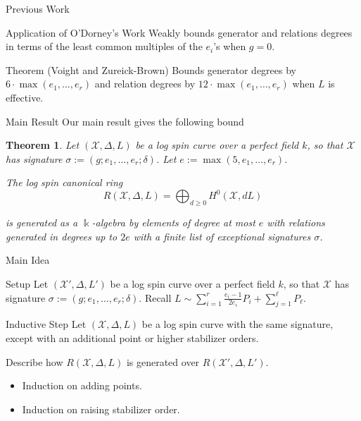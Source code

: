 \documentclass{beamer}
\newtheorem{thm}{Theorem}
\theoremstyle{remark}
\newcommand \sx{{\mathscr X}}
\newcommand{\halfcan}{L}
\newcommand\Bk{{\Bbbk}}
\begin{document}

\begin{frame}{Previous Work}
\begin{block}{Application of O'Dorney's Work}
Weakly bounds generator and relations degrees in terms of
the least common multiples of the $e_i$'s when $g = 0$.
\end{block}

\begin{block}{Theorem (Voight and Zureick-Brown)}
Bounds generator degrees by $6
\cdot \max(e_1, \ldots, e_r)$ and relation degrees by $12 \cdot \max
(e_1, \ldots, e_ r)$ when $\halfcan$ is effective.
\end{block}

\end{frame}


\begin{frame}{Main Result}
Our main result gives the following bound

\begin{thm}
\label{thm:main}
Let $(\sx, \Delta, \halfcan)$ be a log spin curve over a perfect
field $k$, so that $\sx$ has signature $\sigma := (g; e_1, \ldots,
e_r; \delta)$. Let $e := \max(5, e_1, \ldots, e_r)$.

The log spin canonical ring 
\[
	R(\sx, \Delta, \halfcan) = \bigoplus_{d \geq 0} H^0(\sx, d \halfcan)
\]

\noindent
is generated as a $\Bk$-algebra by elements of degree at most $e$ with
relations generated in degrees up to $2e$ with a finite list of exceptional
signatures $\sigma$.
\end{thm}
\end{frame}


\begin{frame}{Main Idea}
\begin{block}{Setup}
Let $(\sx', \Delta, \halfcan')$ be a log spin curve over a perfect
field $k$, so that $\sx$ has signature $\sigma := (g; e_1, \ldots,
e_r; \delta)$. Recall $\halfcan \sim \sum_{i = 1}^{r} \frac{e_i - 1}{2e_i} P_i
+ \sum_{j = 1}^{\ell} P_\ell$.
\end{block}

\begin{block}{Inductive Step}
Let $(\sx, \Delta, \halfcan)$ be a log spin curve with the same
signature, except with an additional point or higher stabilizer
orders.

Describe how $R(\sx, \Delta, \halfcan)$ is generated over
$R(\sx', \Delta, \halfcan')$.
\end{block}

\begin{itemize}
\item Induction on adding points. \\
\item Induction on raising stabilizer order. \\
\end{itemize}
\end{frame}
\end{document}
